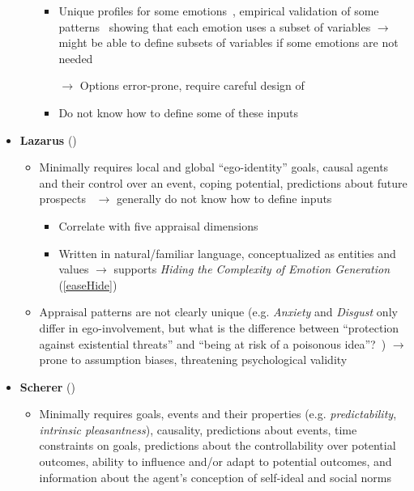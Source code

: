 \begin{itemize}
\begin{itemize}
\begin{itemize}
            \item Unique profiles for some
            emotions~\citep[p.~217--219]{frijda1986emotions}, empirical
            validation of some patterns~\citep[p.~122--123]{frijda1987emotion}
            showing that each emotion uses a subset of variables $\rightarrow$
            might be able to define subsets of variables if some emotions are
            not needed

            \item [$\rightarrow$] Options error-prone, require careful design
            of \progname{}

            \item Do not know how to define some of these
            inputs~\citep[p.~86--87]{roseman2001model}
        \end{itemize}
    \end{itemize}

    \item \textbf{Lazarus} (\disqualified)
    \begin{itemize}
        \item Minimally requires local and global ``ego-identity'' goals,
        causal agents and their control over an event, coping potential,
        predictions about future prospects~\citep[p.~102,
        149--150]{lazarus1991emotion} $\rightarrow$ generally do not know how
        to define inputs~\citep[p.~86--87]{roseman2001model}
        \begin{itemize}
            \item Correlate with five appraisal dimensions

            \item Written in natural/familiar language, conceptualized as
            entities and values $\rightarrow$ supports \textit{Hiding the
                Complexity of Emotion Generation} (\ref{easeHide})
        \end{itemize}

        \item Appraisal patterns are not clearly unique (e.g. \textit{Anxiety}
        and \textit{Disgust} only differ in ego-involvement, but what is the
        difference between ``protection against existential threats'' and
        ``being at risk of a poisonous idea''?~\citep[p.~237,
        261]{lazarus1991emotion}) $\rightarrow$ prone to assumption biases,
        threatening psychological validity
    \end{itemize}

    \item \textbf{Scherer} (\good)
    \begin{itemize}
        \item Minimally requires goals, events and their properties (e.g.
        \textit{predictability}, \textit{intrinsic pleasantness}), causality,
        predictions about events, time constraints on goals, predictions about
        the controllability over potential outcomes, ability to influence
        and/or adapt to potential outcomes, and information about the agent's
        conception of self-ideal and social norms


\end{itemize}
\end{itemize}
